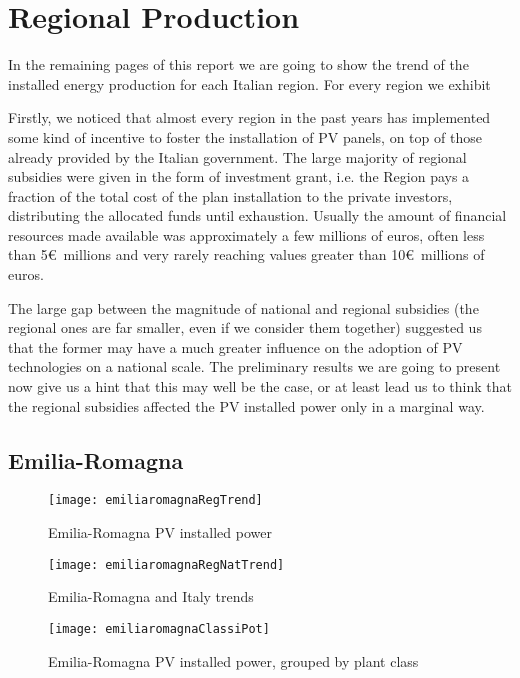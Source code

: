 \documentclass[12pt,a4paper,openright,twoside]{report}
\begin{document}
\section*{Regional Production}

In the remaining pages of this report we are going to show the trend of the installed energy production for each Italian region. For every region we exhibit 

Firstly, we noticed that almost every region in the past years has implemented some kind of incentive to foster the installation of PV panels, on top of those already provided by the Italian government. The large majority of regional subsidies were given in the form of investment grant, i.e. the Region pays a fraction of the total cost of the plan installation to the private investors, distributing the allocated funds until exhaustion. Usually the amount of financial resources made available was approximately a few millions of euros, often less than 5\euro\ millions and very rarely reaching values greater than 10\euro\ millions of euros. 

The large gap between the magnitude of national and regional subsidies (the regional ones are far smaller, even if we consider them together) suggested us that the former may have a much greater influence on the adoption of PV technologies on a national scale. The preliminary results we are going to present now give us a hint that this may well be the case, or at least lead us to think that the regional subsidies affected the PV installed power only in a marginal way.

\subsection*{Emilia-Romagna}

\begin{figure}[hp]
	\centering
	\texttt{[image: emiliaromagnaRegTrend]}
	\caption{Emilia-Romagna PV installed power}
	\label{emiliaromagnaRegTrend}
\end{figure}

\begin{figure}[hp]
	\centering
	\texttt{[image: emiliaromagnaRegNatTrend]}
	\caption{Emilia-Romagna and Italy trends}
	\label{emiliaromagnaRegNatTrend}
\end{figure}

\begin{figure}[hp]
	\centering
	\texttt{[image: emiliaromagnaClassiPot]}
	\caption{Emilia-Romagna PV installed power, grouped by plant class}
	\label{emiliaromagnaClassiPot}
\end{figure}
\end{document}
